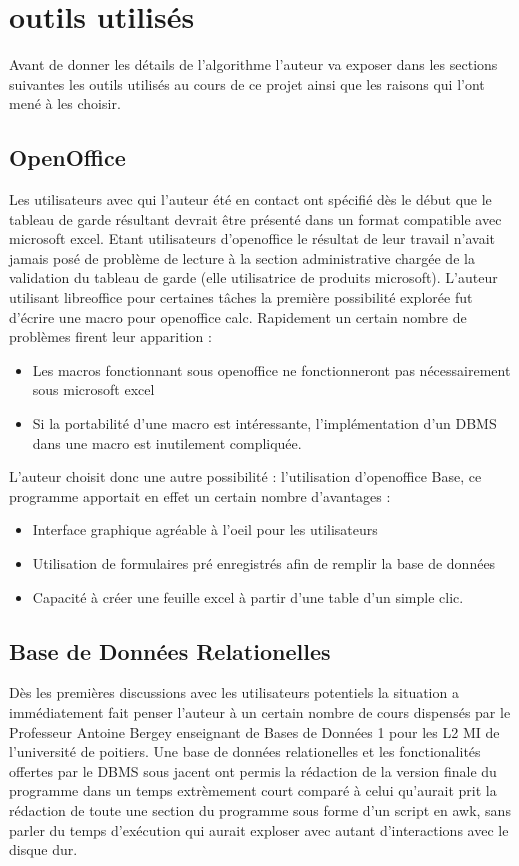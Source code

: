 \documentclass[11pt]{report}
\begin{document}
\section{outils utilisés}
Avant de donner les détails de l'algorithme l'auteur va exposer dans les sections suivantes les outils utilisés au cours de ce projet ainsi que les raisons qui l'ont mené à les choisir.
\subsection{OpenOffice}
	Les utilisateurs avec qui l'auteur été en contact ont spécifié dès le début que le tableau de garde résultant devrait être présenté dans un format compatible avec microsoft excel. 
Etant utilisateurs d'openoffice\cite{openoffice} le résultat de leur travail n'avait jamais posé de problème de lecture à la section administrative chargée de la validation du tableau de garde (elle utilisatrice de produits microsoft).
L'auteur utilisant libreoffice\cite{libreoffice} pour certaines tâches la première possibilité explorée fut d'écrire une macro pour openoffice calc.
Rapidement un certain nombre de problèmes firent leur apparition : 
\begin{itemize}
\item Les macros fonctionnant sous openoffice ne fonctionneront pas nécessairement sous microsoft excel
\item Si la portabilité d'une macro est intéressante, l'implémentation d'un DBMS\cite{DBMS} dans une macro est inutilement compliquée\cite{wheel}.
\end{itemize}

L'auteur choisit donc une autre possibilité : l'utilisation d'openoffice Base, ce programme apportait en effet un certain nombre d'avantages : 
\begin{itemize}
\item Interface graphique agréable à l'oeil pour les utilisateurs
\item Utilisation de formulaires pré enregistrés afin de remplir la base de données
\item Capacité à créer une feuille excel à partir d'une table d'un simple clic.
\end{itemize}
\subsection{Base de Données Relationelles}
Dès les premières discussions avec les utilisateurs potentiels la situation a immédiatement fait penser l'auteur à un certain nombre de cours dispensés par le Professeur Antoine Bergey enseignant de Bases de Données 1 pour les L2 MI de l'université de poitiers.
Une base de données relationelles et les fonctionalités offertes par le DBMS sous jacent ont permis la rédaction de la version finale du programme dans un temps extrèmement court comparé à celui qu'aurait prit la rédaction de toute une section du programme sous forme d'un script en awk, sans parler du temps d'exécution qui aurait exploser avec autant d'interactions avec le disque dur.
\end{document}
